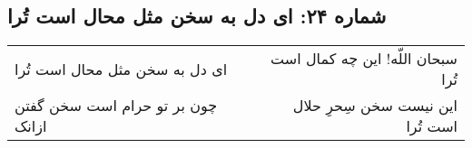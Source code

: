 \begin{center}
\section*{شماره ۲۴: ای دل به سخن مثل محال است تُرا}
\label{sec:024}
\begin{longtable}{l p{0.5cm} r}
ای دل به سخن مثل محال است تُرا
&&
سبحان اللّه! این چه کمال است تُرا
\\
چون بر تو حرام است سخن گفتن ازانک
&&
این نیست سخن سِحرِ حلال است تُرا
\\
\end{longtable}
\end{center}

